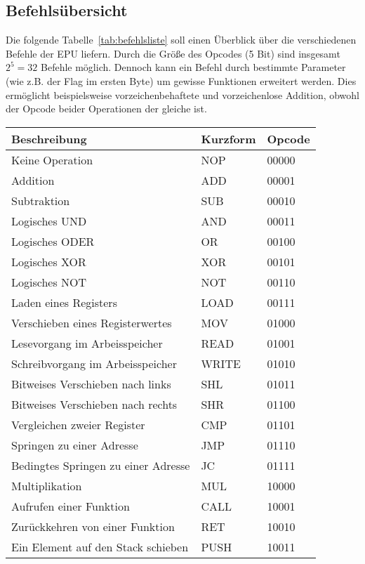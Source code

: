 \subsection{Befehlsübersicht}
Die folgende Tabelle~\ref{tab:befehlsliste} soll einen Überblick über die
verschiedenen Befehle der \ac{EPU} liefern. Durch die Größe des Opcodes (5 Bit)
sind insgesamt $2^5 = 32$ Befehle möglich. Dennoch kann ein Befehl durch
bestimmte Parameter (wie z.B. der Flag im ersten Byte) um gewisse Funktionen
erweitert werden. Dies ermöglicht beispielsweise vorzeichenbehaftete und
vorzeichenlose Addition, obwohl der Opcode beider Operationen der gleiche ist.
\begin{table}[h]
\centering
\begin{tabular}{lll}
\toprule
Beschreibung									& Kurzform	& Opcode\\
\midrule
Keine Operation									& NOP		& 00000\\
Addition										& ADD   	& 00001\\
Subtraktion										& SUB   	& 00010\\
Logisches UND									& AND   	& 00011\\
Logisches ODER									& OR    	& 00100\\
Logisches XOR									& XOR   	& 00101\\
Logisches NOT									& NOT   	& 00110\\
Laden eines Registers							& LOAD  	& 00111\\
Verschieben eines Registerwertes				& MOV   	& 01000\\
Lesevorgang im Arbeisspeicher					& READ  	& 01001\\
Schreibvorgang im Arbeisspeicher				& WRITE 	& 01010\\
Bitweises Verschieben nach links				& SHL   	& 01011\\
Bitweises Verschieben nach rechts				& SHR   	& 01100\\
Vergleichen zweier Register						& CMP   	& 01101\\
Springen zu einer Adresse						& JMP   	& 01110\\
Bedingtes Springen zu einer Adresse				& JC    	& 01111\\
Multiplikation									& MUL   	& 10000\\
Aufrufen einer Funktion							& CALL  	& 10001\\
Zurückkehren von einer Funktion					& RET   	& 10010\\
Ein Element auf den Stack schieben				& PUSH  	& 10011\\

\end{tabular}
\end{table}
